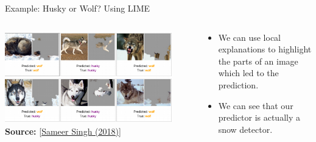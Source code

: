 \documentclass[11pt,compress,t,notes=noshow, aspectratio=169, xcolor=table]{beamer}
\begin{document}
\begin{vbframe}[c]{Example: Husky or Wolf? Using LIME}

	\begin{columns}
	
	\begin{column}{0.7\textwidth}
	    
	\begin{center}
		\includegraphics[width=0.9\textwidth]{figure/lime-wolfhusky3.png}\\
		{\textbf{Source:} [\href{http://www.facweb.iitkgp.ac.in/~niloy/COURSE/Spring2018/IntelligentSystem/PPT_2018/why_should_i_trust_ppt.pdf}{Sameer Singh (2018)}]}
	\end{center}
	    
	\end{column}
	
	\begin{column}{0.3\textwidth}
	    
	\begin{itemize}
		\item We can use local explanations to highlight the parts of an image which led to the prediction.
		\item We can see that our predictor is actually a snow detector. 
	\end{itemize}
	    
	\end{column}
	    
	\end{columns}







\end{vbframe}
\end{document}
